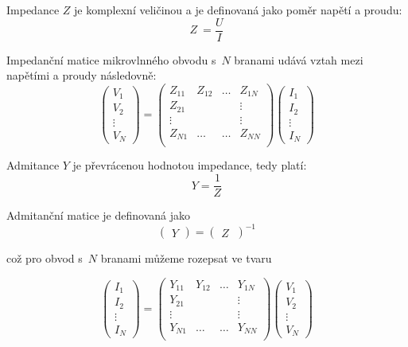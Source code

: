 \documentclass{protokol}
\begin{document}
Impedance $Z$ je komplexní veličinou a je definovaná jako poměr napětí a proudu:
\begin{equation}
	Z~= \frac{U}{I}
\end{equation}

\noindent Impedanční matice mikrovlnného obvodu s~$N$ branami
udává vztah mezi napětími a proudy následovně:
\[
\begin{pmatrix}
	V_1     \\
	V_2		\\
	\vdots	\\
	V_N
\end{pmatrix}
=
\begin{pmatrix}
	Z_{11} & Z_{12} & \dots & Z_{1N}   \\
	Z_{21} &		& 		& \vdots	\\
	\vdots &		& 		& \vdots	\\
	Z_{N1} & \dots	& \dots & Z_{NN} 	\\
\end{pmatrix}
%
\begin{pmatrix}
	I_1     \\
	I_2		\\
	\vdots	\\
	I_N
\end{pmatrix}
\]

\noindent Admitance $Y$ je převrácenou hodnotou impedance, tedy platí:
\begin{equation}
	Y = \frac{1}{Z}
\end{equation}

\noindent Admitanční matice je definovaná jako
\[
\begin{pmatrix}
	Y
\end{pmatrix}
=
\begin{pmatrix}
	Z~\end{pmatrix}^{-1}
\]

\noindent což pro obvod s~$N$ branami můžeme rozepsat ve tvaru

\[
\begin{pmatrix}
	I_1     \\
	I_2		\\
	\vdots	\\
	I_N
\end{pmatrix}
=
\begin{pmatrix}
	Y_{11} & Y_{12} & \dots & Y_{1N}   \\
	Y_{21} &		& 		& \vdots	\\
	\vdots &		& 		& \vdots	\\
	Y_{N1} & \dots	& \dots & Y_{NN} 	\\
\end{pmatrix}
%
\begin{pmatrix}
	V_1     \\
	V_2		\\
	\vdots	\\
	V_N
\end{pmatrix}
\]
\end{document}
